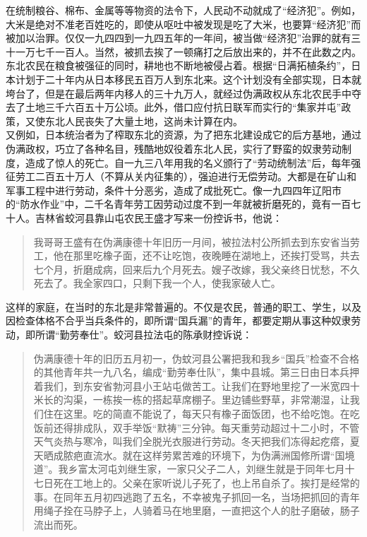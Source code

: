 在统制粮谷、棉布、金属等等物资的法令下，人民动不动就成了“经济犯”。例如，大米是绝对不准老百姓吃的，即使从呕吐中被发现是吃了大米，也要算“经济犯”而被加以治罪。仅仅一九四四到一九四五年的一年间，被当做“经济犯”治罪的就有三十一万七千一百人。当然，被抓去挨了一顿痛打之后放出来的，并不在此数之内。\\

东北农民在粮食被强征的同时，耕地也不断地被侵占着。根据“日满拓植条约”，日本计划于二十年内从日本移民五百万人到东北来。这个计划没有全部实现，日本就垮台了，但是在最后两年内移人的三十九万人，就经过伪满政权从东北农民手中夺去了土地三千六百五十万公顷。此外，借口应付抗日联军而实行的“集家并屯”政策，又使东北人民丧失了大量土地，这尚未计算在内。\\

又例如，日本统治者为了榨取东北的资源，为了把东北建设成它的后方基地，通过伪满政权，巧立了各种名目，残酷地奴役着东北人民，实行了野蛮的奴隶劳动制度，造成了惊人的死亡。自一九三八年用我的名义颁行了“劳动统制法”后，每年强征劳工二百五十万人（不算从关内征集的），强迫进行无偿劳动。大都是在矿山和军事工程中进行劳动，条件十分恶劣，造成了成批死亡。像一九四四年辽阳市的“防水作业”中，二千名青年劳工因劳动过度不到一年就被折磨死的，竟有一百七十人。吉林省蛟河县靠山屯农民王盛才写来一份控诉书，他说：\\

\begin{quote}
	我哥哥王盛有在伪满康德十年旧历一月间，被拉法村公所抓去到东安省当劳工，他在那里吃橡子面，还不让吃饱，夜晚睡在湖地上，还挨打受骂，共去七个月，折磨成病，回来后九个月死去。嫂子改嫁，我父亲终日忧愁，不久死去了。我全家四口，只剩下我一个人，使我家破人亡。\\
\end{quote}

这样的家庭，在当时的东北是非常普遍的。不仅是农民，普通的职工、学生，以及因检查体格不合乎当兵条件的，即所谓“国兵漏”的青年，都要定期从事这种奴隶劳动，即所谓“勤劳奉仕”。蛟河县拉法屯的陈承财控诉说：\\

\begin{quote}
	伪满康德十年的旧历五月初一，伪蚊河县公署把我和我乡“国兵”检查不合格的其他青年共一九八名，编成“勤劳奉仕队”，集中县城。第三日由日本兵押着我们，到东安省勃河县小王站屯做苦工。让我们在野地里挖了一米宽四十米长的沟渠，一栋挨一栋的搭起草席棚子。里边铺些野草，非常潮湿，让我们住在这里。吃的简直不能说了，每天只有橡子面饭团，也不给吃饱。在吃饭前还得排成队，双手举饭“默祷”三分钟。每天重劳动超过十二小时，不管天气炎热与寒冷，叫我们全脱光衣服进行劳动。冬天把我们冻得起疙瘩，夏天晒成脓疤直流水。就在这样劳累苦难的环境下，为伪满洲国修所谓“国境道”。我乡富太河屯刘继生家，一家只父子二人，刘继生就是于同年七月十七日死在工地上的。父亲在家听说儿子死了，也上吊自杀了。挨打是经常的事。在同年五月初四逃跑了五名，不幸被鬼子抓回一名，当场把抓回的青年用绳子拴在马脖子上，人骑着马在地里磨，一直把这个人的肚子磨破，肠子流出而死。\\
\end{quote}

